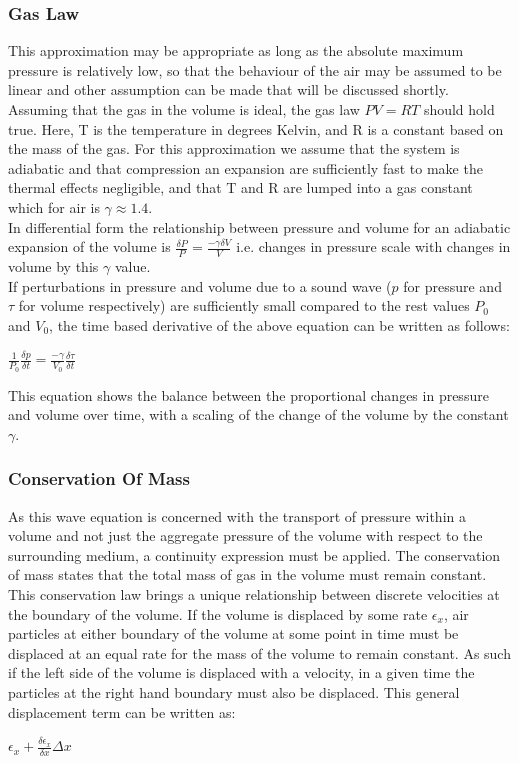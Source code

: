 \subsubsection{Gas Law}
This approximation may be appropriate as long as the absolute maximum pressure is relatively low, so that the behaviour of the air may be assumed to be linear and other assumption can be made that will be discussed shortly.\\
Assuming that the gas in the volume is ideal, the gas law $ PV = RT $ should hold true. Here, T is the temperature in degrees Kelvin, and R is a constant based on the mass of the gas. For this approximation we assume that the system is adiabatic and that compression an expansion are sufficiently fast to make the thermal effects negligible, and that T and R are lumped into a gas constant which for air is $\gamma \approx 1.4$.\\

In differential form the relationship between pressure and volume for an adiabatic expansion of the volume is $\frac{\delta P}{P} = \frac{-\gamma  \delta V}{V} $ i.e. changes in pressure scale with changes in volume by this $\gamma$ value.\\

If perturbations in pressure and volume due to a sound wave ($p$ for pressure and $\tau$ for volume respectively) are sufficiently small compared to the rest values $P_0$ and $V_0$, the time based derivative of the above equation can be written as follows: 
\begin{center}
$\frac{1}{P_0} \frac{\delta p}{\delta t} = \frac{-\gamma}{V_0} \frac{\delta \tau}{\delta t}$\\
\end{center}
This equation shows the balance between the proportional changes in pressure and volume over time, with a scaling of the change of the volume by the constant $\gamma$. \\
\subsubsection{Conservation Of Mass}
As this wave equation is concerned with the transport of pressure within a volume and not just the aggregate pressure of the volume with respect to the surrounding medium, a continuity expression must be applied. The conservation of mass states that the total mass of gas in the volume must remain constant. This conservation law brings a unique relationship between discrete velocities at the boundary of the volume. If the volume is displaced by some rate $\epsilon_x$, air particles at either boundary of the volume at some point in time must be displaced at an equal rate for the mass of the volume to remain constant. As such if the left side of the volume is displaced with a velocity, in a given time the particles at the right hand boundary must also be displaced. This general displacement term can be written as:
\begin{center}
 $\epsilon_x + \frac{\delta \epsilon_x}{\delta x} \Delta x$\\
\end{center}

